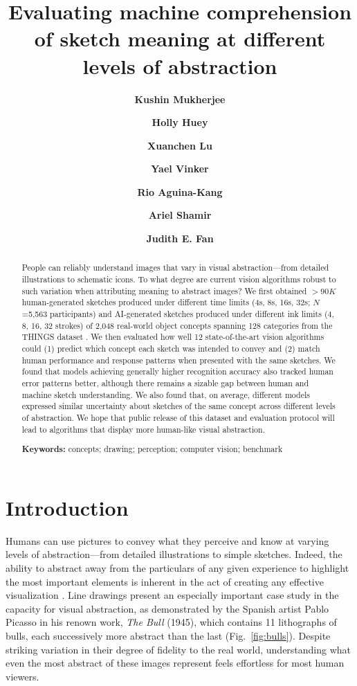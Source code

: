 \documentclass[10pt,letterpaper]{article}
\title{Evaluating machine comprehension of sketch meaning at different levels of abstraction}
\author[1]{\bf Kushin Mukherjee}
\author[2]{\bf Holly Huey}
\author[2]{\bf Xuanchen Lu}
\author[3]{\bf Yael Vinker}
\author[2]{\bf Rio Aguina-Kang}
\author[5]{\bf Ariel Shamir}
\author[2,4]{\bf Judith E. Fan}
\affil[1]{University of Wisconsin-Madison, Madison, WI, United States}
\affil[2]{University of California, San Diego, CA, United States}
\affil[3]{Tel-Aviv University, Tel-Aviv, Israel}
\affil[4]{Stanford University, Stanford, CA, United States}
\affil[5]{Reichman University, Herzliya, Israel}
\begin{document}

\maketitle
\begin{abstract}

People can reliably understand images that vary in visual abstraction---from detailed illustrations to schematic icons. 
To what degree are current vision algorithms robust to such variation when attributing meaning to abstract images? 
We first obtained $>90K$ human-generated sketches produced under different time limits (4s, 8s, 16s, 32s; $N$=5,563 participants) and AI-generated sketches \cite{vinker2022clipasso} produced under different ink limits (4, 8, 16, 32 strokes) of 2,048 real-world object concepts spanning 128 categories from the THINGS dataset \cite{hebart2019things}.
We then evaluated how well 12 state-of-the-art vision algorithms could (1) predict which concept each sketch was intended to convey and (2) match human performance and response patterns when presented with the same sketches.
We found that models achieving generally higher recognition accuracy also tracked human error patterns better, although there remains a sizable gap between human and machine sketch understanding.  
We also found that, on average, different models expressed similar uncertainty about sketches of the same concept across different levels of abstraction.
We hope that public release of this dataset and evaluation protocol will lead to algorithms that display more human-like visual abstraction. 

\textbf{Keywords:} 
concepts; drawing; perception; computer vision; benchmark
\end{abstract}

\section{Introduction}

Humans can use pictures to convey what they perceive and know at varying levels of abstraction---from detailed illustrations to simple sketches.
Indeed, the ability to abstract away from the particulars of any given experience to highlight the most important elements is inherent in the act of creating any effective visualization \cite{viola2017pondering, chen2020foundations,mccloud1998understanding, mi2009abstraction, nan2011conjoining}.
Line drawings present an especially important case study in the capacity for visual abstraction, as demonstrated by the Spanish artist Pablo Picasso in his renown work, \textit{The Bull} (1945), which contains 11 lithographs of bulls, each successively more abstract than the last (Fig.~\ref{fig:bulls}).
Despite striking variation in their degree of fidelity to the real world, understanding what even the most abstract of these images represent feels effortless for most human viewers.
\end{document}
